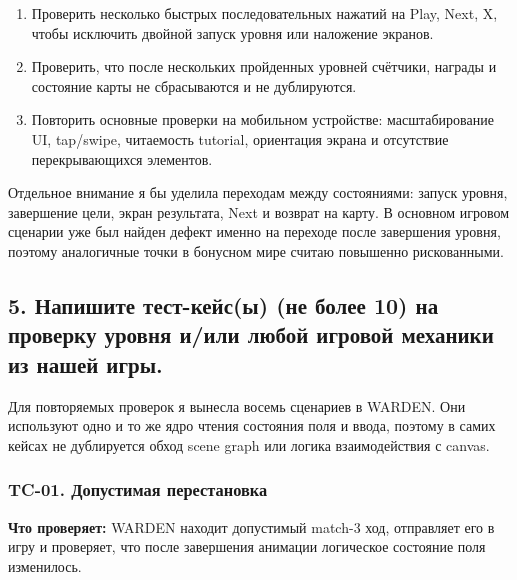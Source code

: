 \documentclass{ZGJournalArticle_2026}
\begin{document}
\begin{enumerate}
  Проверить закрытие карточки уровня и экрана завершения через X, а
  также возврат в ожидаемое предыдущее состояние.
\item
  Проверить несколько быстрых последовательных нажатий на Play, Next, X,
  чтобы исключить двойной запуск уровня или наложение экранов.
\item
  Проверить, что после нескольких пройденных уровней счётчики, награды и
  состояние карты не сбрасываются и не дублируются.
\item
  Повторить основные проверки на мобильном устройстве: масштабирование
  UI, tap/swipe, читаемость tutorial, ориентация экрана и отсутствие
  перекрывающихся элементов.
\end{enumerate}

Отдельное внимание я бы уделила переходам между состояниями: запуск
уровня, завершение цели, экран результата, Next и возврат на карту. В
основном игровом сценарии уже был найден дефект именно на переходе после
завершения уровня, поэтому аналогичные точки в бонусном мире считаю
повышенно рискованными.

\newpage

\subsection{5. Напишите тест-кейс(ы) (не более 10) на проверку уровня
и/или любой игровой механики из нашей
игры.}\label{ux43dux430ux43fux438ux448ux438ux442ux435-ux442ux435ux441ux442-ux43aux435ux439ux441ux44b-ux43dux435-ux431ux43eux43bux435ux435-10-ux43dux430-ux43fux440ux43eux432ux435ux440ux43aux443-ux443ux440ux43eux432ux43dux44f-ux438ux438ux43bux438-ux43bux44eux431ux43eux439-ux438ux433ux440ux43eux432ux43eux439-ux43cux435ux445ux430ux43dux438ux43aux438-ux438ux437-ux43dux430ux448ux435ux439-ux438ux433ux440ux44b.}

Для повторяемых проверок я вынесла восемь сценариев в WARDEN. Они
используют одно и то же ядро чтения состояния поля и ввода, поэтому в
самих кейсах не дублируется обход scene graph или логика взаимодействия
с canvas.

\subsubsection{TC-01. Допустимая
перестановка}\label{tc-01.-ux434ux43eux43fux443ux441ux442ux438ux43cux430ux44f-ux43fux435ux440ux435ux441ux442ux430ux43dux43eux432ux43aux430}

\textbf{Что проверяет:} WARDEN находит допустимый match-3 ход,
отправляет его в игру и проверяет, что после завершения анимации
логическое состояние поля изменилось.
\end{document}
